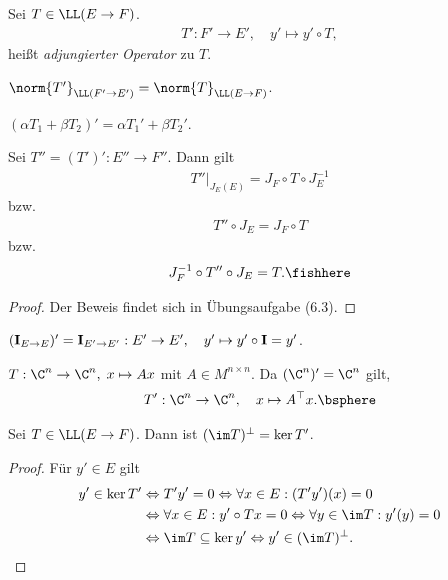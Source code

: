 \begin{defn}
\label{defn:6.17}
Sei $T\in\LL(E\to F)$.
\begin{align*}
T' : F'\to E',\quad y'\mapsto y'\circ T,
\end{align*}
heißt \emph{adjungierter Operator} zu $T$.\fishhere
\end{defn}

\begin{prop}
\label{prop:6.18}
\begin{propenum}
  \item $\norm{T'}_{\LL(F'\to E')}=\norm{T}_{\LL(E\to F)}$.
  \item $(\alpha T_1+\beta T_2)' = \alpha T_1' + \beta T_2'$.
  \item Sei $T'' = (T')' : E''\to F''$. Dann gilt
  \begin{align*}
  T''\big|_{J_E(E)} = J_F\circ T\circ J_E^{-1}
  \end{align*}
bzw.
  \begin{align*}
  T''\circ J_E = J_F\circ T
  \end{align*}
bzw.
  \begin{align*}
  J_F^{-1}\circ T''\circ J_E = T.\fishhere
  \end{align*}
\end{propenum}
\end{prop}
\begin{proof}
Der Beweis findet sich in Übungsaufgabe (6.3).\qedhere
\end{proof}

\begin{bsp}
\label{bsp:6.19}
\begin{bspenum}
  \item $(\mathbf{I}_{E\to E})' = \mathbf{I}_{E'\to E'} : E'\to E',\quad y'\mapsto y'\circ
  \mathbf{I} = y'$.
  \item $T:\C^n\to \C^n,\; x\mapsto Ax$ mit $A\in M^{n\times n}$. Da
  $(\C^n)'=\C^n$ gilt,
\begin{align*}
T': \C^n \to \C^n,\quad x\mapsto A^\top x.\bsphere
\end{align*}
\end{bspenum}
\end{bsp}

\begin{prop}
\label{prop:6.20}
Sei $T\in\LL(E\to F)$. Dann ist $(\im T)^\bot = \ker T'$.\fishhere
\end{prop}
\begin{proof}
Für $y'\in E$ gilt
\begin{align*}
y'\in \ker T' &\Leftrightarrow T'y' = 0 \Leftrightarrow \forall x\in E :
(T'y')(x) = 0 \\ &\Leftrightarrow \forall x\in E : y'\circ Tx  = 0
\Leftrightarrow \forall y\in \im T : y'(y) = 0\\
&\Leftrightarrow \im T \subseteq \ker y' \Leftrightarrow y'\in (\im
T)^\bot.\qedhere
\end{align*}
\end{proof}

